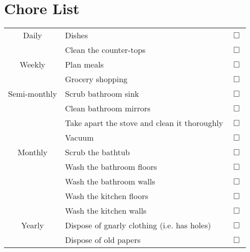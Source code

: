 \documentclass[12pt]{article}
\begin{document}
\section*{Chore List}

\begin{tabular}{|c|l|r|}
  \hline
  Daily						& Dishes & $\Box$ \\
									& Clean the counter-tops & $\Box$ \\ \cline{2-2}
  \hline \hline
	Weekly					& Plan meals \hspace*{45mm}& $\Box$ \\
									& Grocery shopping & $\Box$ \\ \cline{2-2}
  \hline \hline 
	Semi-monthly		& Scrub bathroom sink & $\Box$ \\
									& Clean bathroom mirrors & $\Box$ \\
									& Take apart the stove and clean it thoroughly & $\Box$ \\
									& Vacuum & $\Box$ \\ \cline{2-2}
  \hline \hline
	 Monthly				& Scrub the bathtub & $\Box$ \\
									&	Wash the bathroom floors & $\Box$ \\
									&	Wash the bathroom walls & $\Box$ \\
									&	Wash the kitchen floors & $\Box$ \\
									&	Wash the kitchen walls & $\Box$ \\ \cline{2-2}
  \hline \hline
	 Yearly					& Dispose of gnarly clothing (i.e. has holes)& $\Box$ \\
									& Dispose of old papers & $\Box$ \\ \cline{2-2}
  \hline
\end{tabular}
\end{document}
